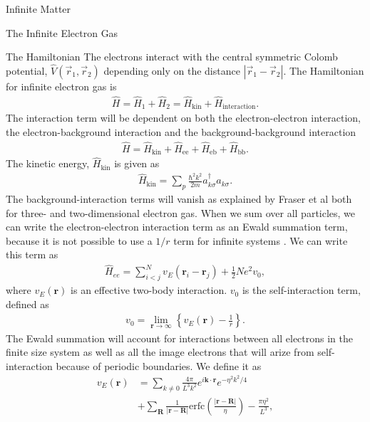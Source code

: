 \documentclass[twoside,english]{uiofysmaster}
\begin{document}
\begin{chapter}{Infinite Matter}
\begin{section}{The Infinite Electron Gas}
		\begin{subsection}{The Hamiltonian}
			The electrons interact with the central symmetric Colomb potential, $\hat V(\vec r_1, \vec r_2)$ depending only on the distance $\left| \vec r_1 - \vec r_2 \right|$. The Hamiltonian for infinite electron gas is \cite{Baardsen}
			\begin{align}
				\hat H = \hat H_1 + \hat H_2 = \hat H_{\text{kin}} + \hat H_{\text{interaction}}.
			\end{align}
			The interaction term will be dependent on both the electron-electron interaction, the electron-background interaction and the background-background interaction
			\begin{align}
				\hat H = \hat H_{\text{kin}} + \hat H_{\text{ee}} + \hat H_{\text{eb}} + \hat H_{\text{bb}}.
			\end{align}
			The kinetic energy, $\hat H_{\text{kin}}$ is given as
			\begin{align}
				\hat H_{\text{kin}} = \sum_p \frac{\hbar ^2 k^2}{2m} a_{k \sigma}^{\dagger} a_{k \sigma}.
			\end{align}
			The background-interaction terms will vanish as explained by Fraser et al \cite{Fraser et al} both for three- and two-dimensional electron gas. When we sum over all particles, we can write the electron-electron interaction term as an Ewald summation term, because it is not possible to use a $1/r$ term for infinite systems \cite{Drummond2008} \cite{MHJonline}. We can write this term as
			\begin{align}
				\hat H_{ee} = \sum_{i<j}^N v_E(\mathbf{r}_i - \mathbf{r}_j) + \frac{1}{2}Ne^2v_0,
			\end{align}
			where $v_E(\mathbf{r})$ is an effective two-body interaction. $v_0$ is the self-interaction term, defined as 
			\begin{align}
				v_0 = \lim_{\mathbf{r}\rightarrow \infty} \left\{ v_E(\mathbf{r}) - \frac{1}{r} \right\}.
			\end{align}
			The Ewald summation will account for interactions between all electrons in the finite size system as well as all the image electrons that will arize from self-interaction because of periodic boundaries. We define it as 
			\begin{align}
				v_E(\mathbf{r}) &= \sum_{k \neq 0} \frac{4\pi}{L^3k^2} e^{i \mathbf{k}\cdot \mathbf{r} } e^{-\eta^2 k^2 / 4} \\
								&+ \sum_{\mathbf{R}} \frac{1}{|	\mathbf{r} - \mathbf{R}|} \text{erfc} \left( \frac{| \mathbf{r} - \mathbf{R}|}{\eta} \right) - \frac{\pi \eta^2}{L^3}, \nonumber

\end{align}
\end{subsection}
\end{section}
\end{chapter}
\end{document}
